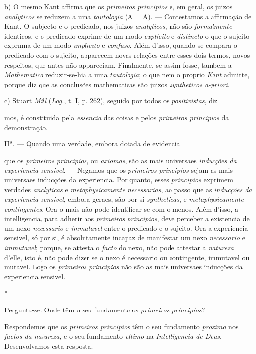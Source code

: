 b) O mesmo Kant affirma que os \emph{primeiros principios} e, em geral, os juizos \emph{analyticos} se reduzem a uma \emph{tautologia} (A = A). --- Contestamos a affirmação de Kant. O subjecto e o predicado, nos juizos \emph{analyticos}, não são \emph{formalmente} identicos, e o predicado exprime de um modo \emph{explicito} e \emph{distincto} o que o sujeito exprimia de um modo \emph{implicito} e \emph{confuso}. Além d'isso, quando se compara o predicado com o sujeito, apparecem novas relações entre esses dois termos, novos respeitos, que antes não appareciam. Finalmente, se assim fosse, tambem a \emph{Mathematica} reduzir-se-hia a uma \emph{tautologia}; o que nem o proprio \emph{Kant} admitte, porque diz que as conclusões mathematicas são juizos \emph{syntheticos a-priori}.

c) Stuart \emph{Mill} (\emph{Log.}, t. I, p. 262), seguido por todos os \emph{positivistas}, diz


mos, é constituida pela \emph{essencia} das coisas e pelos \emph{primeiros principios} da demonstração.

IIª. --- Quando uma verdade, embora dotada de evidencia

que os \emph{primeiros principios}, ou \emph{axiomas}, são as mais universaes \emph{inducções da experiencia sensivel}. --- Negamos que os \emph{primeiros principios} sejam as mais universaes inducções da experiencia. Por quanto, esses \emph{principios} exprimem verdades \emph{analyticas} e \emph{metaphysicamente necessarias}, ao passo que as \emph{inducções da experiencia sensivel}, embora geraes, são por si \emph{syntheticas}, e \emph{metaphysicamente contingentes}. Ora o mais não pode identificar-se com o menos. Além d'isso, a intelligencia, para adherir aos \emph{primeiros principios}, deve perceber a existencia de um nexo \emph{necessario} e \emph{immutavel} entre o predicado e o sujeito. Ora a experiencia sensivel, só por si, é absolutamente incapaz de manifestar um nexo \emph{necessario} e \emph{immutavel}; porque, se attesta o \emph{facto} do nexo, não pode attestar a \emph{natureza} d'elle, isto é, não pode dizer se o nexo é necessario ou contingente, immutavel ou mutavel. Logo os \emph{primeiros principios} não são as mais universaes inducções da experiencia sensivel.

*

Pergunta-se: Onde têm o seu fundamento os \emph{primeiros principios}?

Respondemos que os \emph{primeiros principios} têm o seu fundamento \emph{proximo} nos \emph{factos da natureza}, e o seu fundamento \emph{ultimo} na \emph{Intelligencia de Deus}. --- Desenvolvamos esta resposta.


